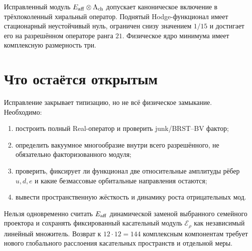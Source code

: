 \begin{theorem}
Исправленный модуль $E_{\rm aff}\otimes\Lambda_{\rm ch}$ допускает
каноническое включение в трёхпоколенный хиральный оператор. Поднятый
Hodge-функционал имеет стационарный неустойчивый нуль, ограничен снизу
значением $1/15$ и достигает его на разрешённом операторе ранга $21$.
Физическое ядро минимума имеет комплексную размерность три.
\end{theorem}

\section{Что остаётся открытым}

Исправление закрывает типизацию, но не всё физическое замыкание.
Необходимо:
\begin{enumerate}
 \item построить полный Real-оператор и проверить junk/BRST--BV фактор;
 \item определить вакуумное многообразие внутри всего разрешённого, не
 обязательно факторизованного модуля;
 \item проверить, фиксирует ли функционал две относительные амплитуды
 рёбер $u,d,e$ и какие безмассовые орбитальные направления остаются;
 \item вывести пространственную жёсткость и динамику роста отрицательных мод.
\end{enumerate}

\begin{nogocriterion}
Нельзя одновременно считать $E_{\rm aff}$ динамической заменой выбранного
семейного проектора и сохранять фиксированный касательный модуль
$\mathcal E_\rho$ как независимый линейный множитель. Возврат к
$12\cdot12=144$ комплексным компонентам требует нового глобального
расслоения касательных пространств и отдельной меры.
\end{nogocriterion}

